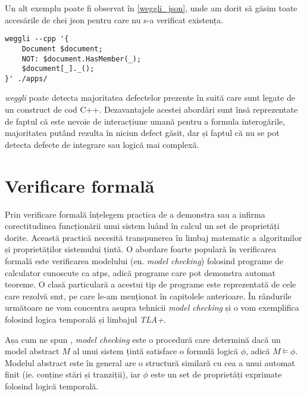 Un alt exemplu poate fi observat în \ref{weggli_json}, unde am dorit să găsim toate accesările de chei \acrshort{json} pentru care nu s-a verificat existența.

\begin{lstlisting}[label={weggli_json}, caption={Interogare weggli pentru a găsi accesarea de chei JSON fără verificare}]
weggli --cpp '{ 
    Document $document;
    NOT: $document.HasMember(_);
    $document[_]._();
}' ./apps/
\end{lstlisting}

\textit{weggli} poate detecta majoritatea defectelor prezente în suită care sunt legate de un construct de cod C++. Dezavantajele acestei abordări sunt însă reprezentate de faptul că este nevoie de interacțiune umană pentru a formula interogările, majoritatea putând rezulta în niciun defect găsit, dar și faptul că nu se pot detecta defecte de integrare sau logică mai complexă.



\section{Verificare formală}

Prin verificare formală înțelegem practica de a demonstra sau a infirma corectitudinea funcționării unui sistem luând în calcul un set de proprietăți dorite. Această practică necesită transpunerea în limbaj matematic a algoritmilor și proprietăților sistemului țintă. O abordare foarte populară în verificarea formală este verificarea modelului (en. \textit{model checking}) folosind programe de calculator cunoscute ca \acrfull{atps}, adică programe care pot demonstra automat teoreme. O clasă particulară a acestui tip de programe este reprezentată de cele care rezolvă \acrfull{smt}, pe care le-am menționat în capitolele anterioare. În rândurile următoare ne vom concentra asupra tehnicii \textit{model checking} și o vom exemplifica folosind logica temporală și limbajul \textit{TLA+}.

Așa cum ne spun \citet{Markus1999}, \textit{model checking} este o procedură care determină dacă un model abstract $M$ al unui sistem țintă satisface o formulă logică $\phi$, adică $M \models \phi$. Modelul abstract este în general are o structură similară cu cea a unui automat finit (ie. conține stări și tranziții), iar $\phi$ este un set de proprietăți exprimate folosind logică temporală.

